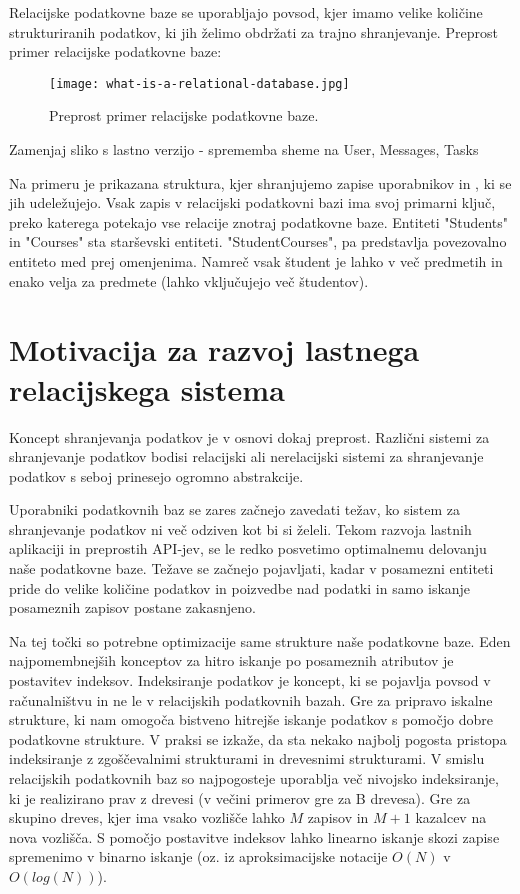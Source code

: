 \documentclass[a4paper,12pt,openright]{book}
\begin{document}
    Relacijske podatkovne baze se uporabljajo povsod, kjer imamo velike količine strukturiranih podatkov, ki jih želimo obdržati za trajno shranjevanje. Preprost primer relacijske podatkovne baze:
    
    \begin{figure}[h]
        \centerline{\texttt{[image: what-is-a-relational-database.jpg]}}
        \caption{Preprost primer relacijske podatkovne baze.}
        \label{sl:mindmap}
    \end{figure}

    \colorbox{BurntOrange}{Zamenjaj sliko s lastno verzijo - sprememba sheme na User, Messages, Tasks}

    Na primeru je prikazana struktura, kjer shranjujemo zapise uporabnikov in , ki se jih udeležujejo. Vsak zapis v relacijski podatkovni bazi ima svoj primarni ključ, preko katerega potekajo vse relacije znotraj podatkovne baze. Entiteti "Students" in "Courses" sta starševski entiteti. "StudentCourses", pa predstavlja povezovalno entiteto med prej omenjenima. Namreč vsak študent je lahko v več predmetih in enako velja za predmete (lahko vključujejo več študentov).

    \section{Motivacija za razvoj lastnega relacijskega sistema}
    Koncept shranjevanja podatkov je v osnovi dokaj preprost. Različni sistemi za shranjevanje podatkov bodisi relacijski ali nerelacijski sistemi za shranjevanje podatkov s seboj prinesejo ogromno abstrakcije.

    Uporabniki podatkovnih baz se zares začnejo zavedati težav, ko sistem za shranjevanje podatkov ni več odziven kot bi si želeli. Tekom razvoja lastnih aplikaciji in preprostih API-jev, se le redko posvetimo optimalnemu delovanju naše podatkovne baze. Težave se začnejo pojavljati, kadar v posamezni entiteti pride do velike količine podatkov in poizvedbe nad podatki in samo iskanje posameznih zapisov postane zakasnjeno.

    Na tej točki so potrebne optimizacije same strukture naše podatkovne baze. Eden najpomembnejših konceptov za hitro iskanje po posameznih atributov je postavitev indeksov. Indeksiranje podatkov je koncept, ki se pojavlja povsod v računalništvu in ne le v relacijskih podatkovnih bazah. Gre za pripravo iskalne strukture, ki nam omogoča bistveno hitrejše iskanje podatkov s pomočjo dobre podatkovne strukture. V praksi se izkaže, da sta nekako najbolj pogosta pristopa indeksiranje z zgoščevalnimi strukturami in drevesnimi strukturami. V smislu relacijskih podatkovnih baz so najpogosteje uporablja več nivojsko indeksiranje, ki je realizirano prav z drevesi (v večini primerov gre za B drevesa). Gre za skupino dreves, kjer ima vsako vozlišče lahko $M$ zapisov in $M+1$ kazalcev na nova vozlišča. S pomočjo postavitve indeksov lahko linearno iskanje skozi zapise spremenimo v binarno iskanje (oz. iz aproksimacijske notacije $O(N)$ v $O(log(N))$).
\end{document}
